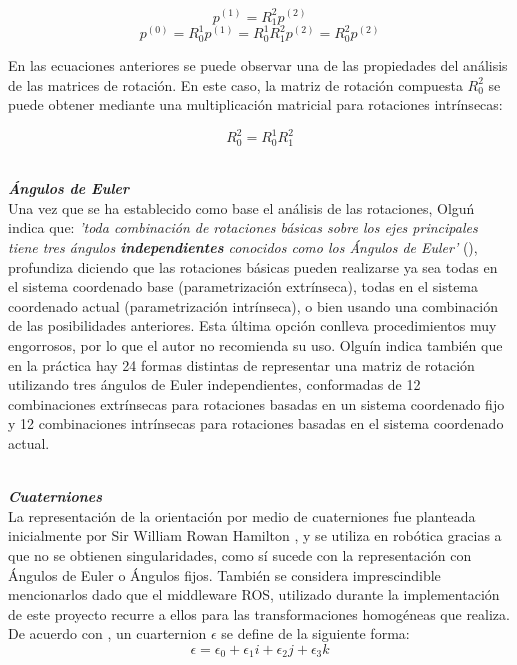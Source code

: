 \begin{equation*}
    p^{(1)}=R_{1}^{2}p^{(2)}
\end{equation*}
\begin{equation}
    p^{(0)}=R_{0}^{1}p^{(1)} =R_{0}^{1}R_{1}^{2}p^{(2)} =R_{0}^{2}p^{(2)}
    \label{eqn:rot_punto}
\end{equation}

En las ecuaciones anteriores se puede observar una de las propiedades del análisis de las matrices de rotación. En este caso, la matriz de rotación compuesta $R_{0}^{2}$ se puede obtener mediante una multiplicación matricial para rotaciones intrínsecas:

\begin{equation} R_{0}^{2}=R_{0}^{1}R_{1}^{2}
\label{eqn:mtxRotCompuesta}
\end{equation}

\phantom{holis}\\
\textbf{\textit{Ángulos de Euler}}\\

Una vez que se ha establecido como base el análisis de las rotaciones, Olguń indica que: \textit{'toda combinación de rotaciones básicas sobre los ejes principales tiene tres ángulos \textbf{independientes} conocidos como los Ángulos de Euler'} (\cite*{olguin_diaz_3d_2019}), profundiza diciendo que las rotaciones básicas pueden realizarse ya sea todas en el sistema coordenado base (parametrización extrínseca), todas en el sistema coordenado actual (parametrización intrínseca), o bien usando una combinación de las posibilidades anteriores. Esta última opción conlleva procedimientos muy engorrosos, por lo que el autor no recomienda su uso. Olguín indica también que en la práctica hay 24 formas distintas de representar una matriz de rotación utilizando tres ángulos de Euler independientes, conformadas de 12 combinaciones extrínsecas para rotaciones basadas en un sistema coordenado fijo y 12 combinaciones intrínsecas para rotaciones basadas en el sistema coordenado actual.

\phantom{holis}\\
\textbf{\textit{Cuaterniones}}\\

La representación de la orientación por medio de cuaterniones fue planteada inicialmente por Sir William Rowan Hamilton \cite{hamilton_ii_1844}, y se utiliza en robótica gracias a que no se obtienen singularidades, como sí sucede con la representación con Ángulos de Euler o Ángulos fijos. También se considera imprescindible mencionarlos dado que el middleware ROS, utilizado durante la implementación de este proyecto recurre a ellos para las transformaciones homogéneas que realiza.
De acuerdo con \cite{siciliano_springer_2016}, un cuarternion \textbf{$\epsilon$} se define de la siguiente forma:
\begin{equation}
    \epsilon = \epsilon_{0}+\epsilon_{1}i+
    \epsilon_{2}j+
    \epsilon_{3}k
    \label{eqn:quat_def}
\end{equation}

